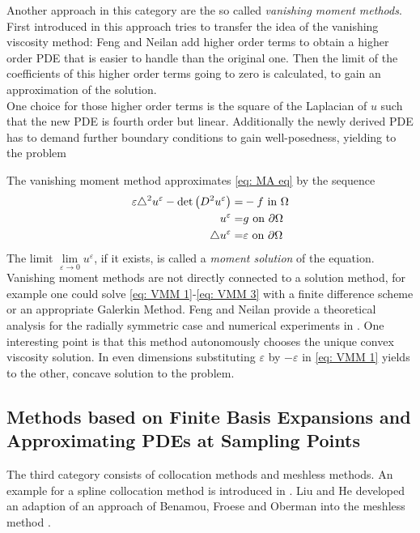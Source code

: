 Another approach in this category are the so called \emph{vanishing moment methods}. First introduced in \cite{FN2009} this approach tries to transfer the idea of the vanishing viscosity method: Feng and Neilan add higher order terms to obtain a higher order PDE that is easier to handle than the original one. Then the limit of the coefficients of this higher order terms going to zero is calculated, to gain an approximation of the \MA solution. \\
One choice for those higher order terms is the square of the Laplacian of $u$ such that the new PDE is fourth order but linear. Additionally the newly derived PDE has to demand further boundary conditions to gain well-posedness, yielding to the problem
\begin{definition}
	The vanishing moment method approximates \eqref{eq: MA eq} by the sequence
	\begin{align}
		\varepsilon \triangle^2 u^\varepsilon - \det{\left(D^2 u^\varepsilon\right)} =& -f \text{ in } \Omega \label{eq: VMM 1}\\ 
		u^\varepsilon =& g \text{ on } \partial \Omega \label{eq: VMM 2}\\
		\triangle u^\varepsilon = & \varepsilon \text{ on } \partial \Omega \label{eq: VMM 3}
	\end{align}
The limit $\lim\limits_{\varepsilon \rightarrow 0 } u^\varepsilon$, if it exists, is called a \emph{moment solution} of the \MA equation.
Vanishing moment methods are not directly connected to a solution method, for example one could solve \eqref{eq: VMM 1}-\eqref{eq: VMM 3} with a finite difference scheme or an appropriate Galerkin Method.
Feng and Neilan provide a theoretical analysis for the radially symmetric case and numerical experiments in \cite{FN2009, Neilan2010, FN2011a}. One interesting point is that this method autonomously chooses the unique convex viscosity solution. In even dimensions substituting $\varepsilon$ by $-\varepsilon$ in  \eqref{eq: VMM 1} yields to the other, concave solution to the \MA problem.  
\end{definition}


\subsection{Methods based on Finite Basis Expansions and Approximating PDEs at Sampling Points}
The third category consists of collocation methods and meshless methods.
An example for a spline collocation method is introduced in \cite{BHP2014}. 
Liu and He developed an adaption of an approach of Benamou, Froese and Oberman into the meshless method \cite{LH2013}.
